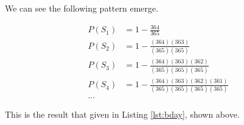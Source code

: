 \documentclass{article}
\begin{document}
We can see the following pattern emerge.

\begin{align*}
	P(S_1) & = 1 - \frac{364}{365} \\
	P(S_2) & = 1 - \frac{(364)(363)}{(365)(365)} \\
	P(S_3) & = 1 - \frac{(364)(363)(362)}{(365)(365)(365)} \\
	P(S_4) & = 1 - \frac{(364)(363)(362)(361)}{(365)(365)(365)(365)} \\
	\dots  &
\end{align*}

This is the result that given in Listing \ref{lst:bday}, shown above. 

\clearpage
\printbibliography
\end{document}
